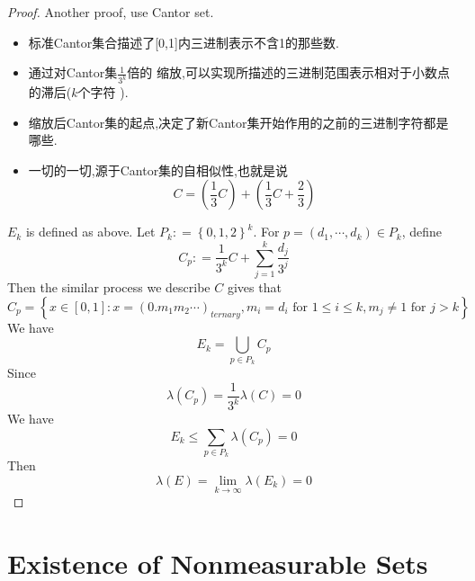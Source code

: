 \documentclass[../main.tex]{subfiles}
\begin{document}
\begin{proof}
    Another proof, use Cantor set. 
    \begin{note}
        \begin{itemize}
            \item 标准Cantor集合描述了[0,1]内三进制表示不含1的那些数. 
            \item 通过对Cantor集\(  \frac{1}{3^{k}}  \)倍的 缩放,可以实现所描述的三进制范围表示相对于小数点的滞后(\(  k  \)个字符 ).
            \item 缩放后Cantor集的起点,决定了新Cantor集开始作用的之前的三进制字符都是哪些.
            \item 一切的一切,源于Cantor集的自相似性,也就是说 \[
            C= \left( \frac{1 }{3 }C  \right)+ \left( \frac{1 }{3 }C+ \frac{2 }{3 }   \right)  
            \]
        \end{itemize}
    \end{note}
    \(  E_{k}  \) is defined as above. Let \(  P_{k}: = \left\{ 0,1,2 \right\}^{k}  \). For \(  p= \left( d_1,\cdots ,d _{k} \right) \in P_{k}   \), define \[
    C_{p}: = \frac{1}{3^{k}}C +  \sum _{j = 1}^{k}\frac{d _{j} }{3^{j} } 
    \]   Then the similar process we describe \(  C  \) gives that  \[
    C_{p}= \left\{ x \in \left[ 0,1 \right]:   x = \left( 0.m_1m_2 \cdots \right)_{ternary} ,  m_{i}= d _{i} \text{ for }1\le i\le k, m_{j}\neq 1 \text{ for } j> k \right\}
    \] We have \[
    E_{k} =  \bigcup _{ p \in P_{k}}C_{p}
    \]  Since \[
     \lambda \left( C_{p} \right)= \frac{1}{3^{k}} \lambda \left( C \right)  = 0
    \] We have \[
    E_{k}\le \sum _{ p \in P_{k}} \lambda \left( C_{p} \right) = 0
    \]Then \[
     \lambda \left( E \right)= \lim_{k\to \infty} \lambda \left( E_{k} \right)= 0  
    \]
\end{proof}

\section{Existence of Nonmeasurable Sets}
\end{document}
